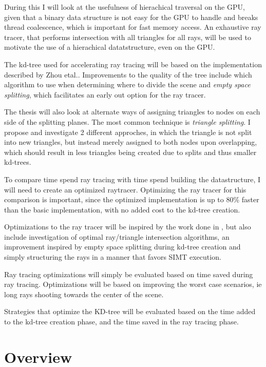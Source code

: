 During this I will look at the usefulness of hierachical traversal
on the GPU, given that a binary data structure is not easy for the
GPU to handle and breaks thread coalescence, which is important for
fast memory access. An exhaustive ray tracer, that performs
intersection with all triangles for all rays, will be used to
motivate the use of a hierachical datatstructure, even on the GPU.

The kd-tree used for accelerating ray tracing will be based on the
implementation described by Zhou etal..
Improvements to the quality of the tree include which algorithm to use
when determining where to divide the scene and \textit{empty space
  splitting}, which facilitates an early out option for the ray
tracer. 

The thesis will also look at alternate ways of assigning triangles to
nodes on each side of the splitting planes. The most common technique
is \textit{triangle splitting}. I propose and investigate 2 different
approches, in which the triangle is not split into new triangles, but
instead merely assigned to both nodes upon overlapping, which should
result in less triangles being created due to splits and thus smaller
kd-trees.

To compare time spend ray tracing with time spend building the
datastructure, I will need to create an optimized
raytracer. Optimizing the ray tracer for this comparison is important,
since the optimized implementation is up to 80\% faster than the basic
implementation, with no added cost to the kd-tree creation.

Optimizations to the ray tracer will be inspired by the work done in
, but also include investigation of optimal
ray/triangle intersection algorithms, an improvement inspired by
empty space splitting during kd-tree creation and simply structuring
the rays in a manner that favors SIMT execution.



Ray tracing optimizations will simply be evaluated based on time saved
during ray tracing. Optimizations will be based on improving the
worst case scenarios, ie long rays shooting towards the center of
the scene.

Strategies that optimize the KD-tree will be evaluated based on the
time added to the kd-tree creation phase, and the time saved in the
ray tracing phase.

\section{Overview}

